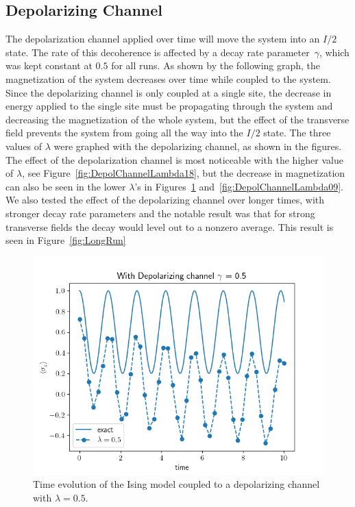 \documentclass[12pt, twocolumn]{article}
\begin{document}
  \subsection{Depolarizing Channel}
  The depolarization channel applied over time will move the system into an \( I / 2 \) state. The rate of this decoherence is affected by a decay rate parameter~\( \gamma \), which was kept constant at \( 0.5 \) for all runs. As shown by the following graph, the magnetization of the system decreases over time while coupled to the system. Since the depolarizing channel is only coupled at a single site, the decrease in energy applied to the single site must be propagating through the system and decreasing the magnetization of the whole system, but the effect of the transverse field prevents the system from going all the way into the \( I / 2 \) state. The three values of \( \lambda \) were graphed with the depolarizing channel, as shown in the figures. The effect of the depolarization channel is most noticeable with the higher value of \( \lambda \), see Figure~\ref{fig:DepolChannelLambda18}, but the decrease in magnetization can also be seen in the lower \( \lambda \)'s in Figures~\ref{fig:DepolChannelLambda05} and~\ref{fig:DepolChannelLambda09}. We also tested the effect of the depolarizing channel over longer times, with stronger decay rate parameters and the notable result was that for strong transverse fields the decay would level out to a nonzero average. This result is seen in Figure~\ref{fig:LongRun}

  \begin{figure}
    \centering
    \includegraphics[width=\linewidth]{images/DepolChannelLambda05.png}
    \caption{Time evolution of the Ising model coupled to a depolarizing channel with \( \lambda = 0.5 \).%
      \label{fig:DepolChannelLambda05}}
  \end{figure}
\end{document}
